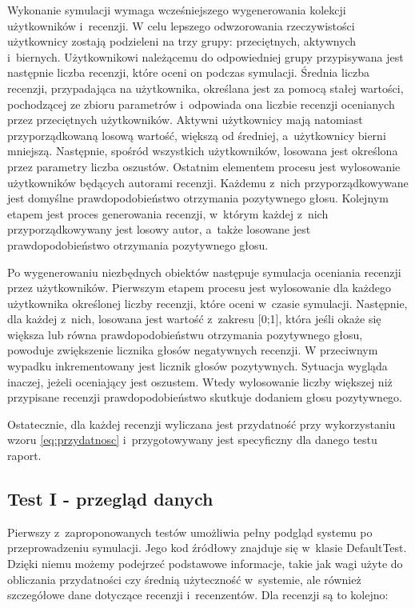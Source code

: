 Wykonanie symulacji wymaga wcześniejszego wygenerowania kolekcji użytkowników i~recenzji. W celu lepszego odwzorowania rzeczywistości użytkownicy zostają podzieleni na trzy grupy: przeciętnych, aktywnych i~biernych. Użytkownikowi należącemu do odpowiedniej grupy przypisywana jest następnie liczba recenzji, które oceni on podczas symulacji. Średnia liczba recenzji, przypadająca na użytkownika, określana jest za pomocą stałej wartości, pochodzącej ze zbioru parametrów i~odpowiada ona liczbie recenzji ocenianych przez przeciętnych użytkowników. Aktywni użytkownicy  mają natomiast przyporządkowaną losową wartość, większą od średniej, a~użytkownicy bierni mniejszą. Następnie, spośród wszystkich użytkowników, losowana jest określona przez parametry liczba oszustów. Ostatnim elementem procesu jest wylosowanie użytkowników będących autorami recenzji. Każdemu z~nich przyporządkowywane jest domyślne prawdopodobieństwo otrzymania pozytywnego głosu. Kolejnym etapem jest proces generowania recenzji, w~którym każdej z~nich przyporządkowywany jest losowy autor, a~także losowane jest prawdopodobieństwo otrzymania pozytywnego głosu.

Po wygenerowaniu niezbędnych obiektów następuje symulacja oceniania recenzji przez użytkowników. Pierwszym etapem procesu jest wylosowanie dla każdego użytkownika określonej liczby recenzji, które oceni w~czasie symulacji. Następnie, dla każdej z~nich, losowana jest wartość z~zakresu [0;1], która jeśli okaże się większa lub równa prawdopodobieństwu otrzymania pozytywnego głosu, powoduje zwiększenie licznika głosów negatywnych recenzji. W przeciwnym wypadku inkrementowany jest licznik głosów pozytywnych. Sytuacja wygląda inaczej, jeżeli oceniający jest oszustem. Wtedy wylosowanie liczby większej niż przypisane recenzji prawdopodobieństwo skutkuje dodaniem głosu pozytywnego. 

Ostatecznie, dla każdej recenzji wyliczana jest przydatność przy wykorzystaniu wzoru \ref{eq:przydatnosc} i~przygotowywany jest specyficzny dla danego testu raport.

\subsection{Test I - przegląd danych}

Pierwszy z~zaproponowanych testów umożliwia pełny podgląd systemu po przeprowadzeniu symulacji. Jego kod źródłowy znajduje się w~klasie DefaultTest. Dzięki niemu możemy podejrzeć podstawowe informacje, takie jak wagi użyte do obliczania przydatności czy średnią użyteczność w~systemie, ale również szczegółowe dane dotyczące recenzji i~recenzentów. Dla recenzji są to kolejno:

